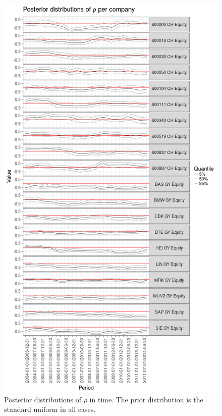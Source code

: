 \begin{figure}[p]
	\vspace*{-3.2cm}
	\centering
	\includegraphics[width=\linewidth]{../calculations/rho-timeline}
	\caption[Timeline of posterior $\rho$]{Posterior distributions of $\rho$ in time. The prior distribution is the standard uniform in all cases.}
	\label{fig:company-rhos}
\end{figure}


